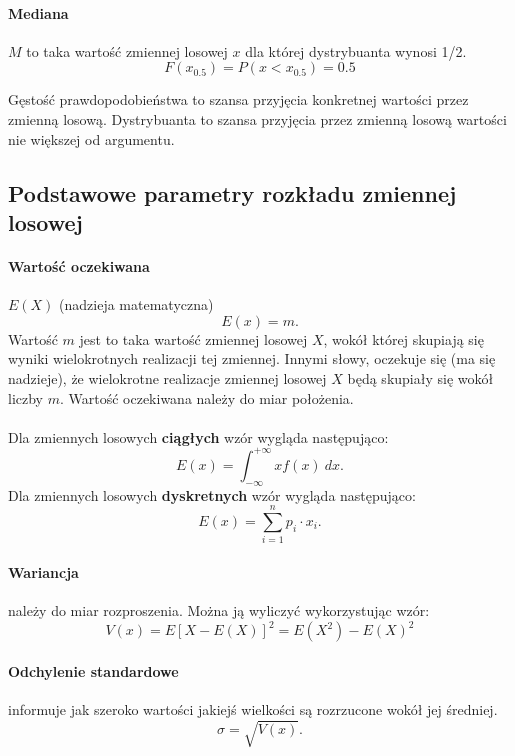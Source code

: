\documentclass[a4paper,twoside]{report}
\begin{document}
\paragraph{Mediana} $M$ to taka wartość zmiennej losowej $x$ dla której dystrybuanta wynosi 1/2.
\begin{equation}
F(x_{0.5}) = P(x < x_{0.5}) = 0.5
\end{equation}


Gęstość prawdopodobieństwa to szansa przyjęcia konkretnej wartości
przez zmienną losową. Dystrybuanta to szansa przyjęcia przez zmienną
losową wartości nie większej od argumentu.

\subsection{Podstawowe parametry rozkładu zmiennej losowej}
\paragraph{Wartość oczekiwana} $E(X)$ (nadzieja matematyczna)
\begin{equation}
E(x) = m.
\end{equation}
Wartość $m$ jest to taka wartość zmiennej losowej $X$, wokół której skupiają się
wyniki wielokrotnych realizacji tej zmiennej. Innymi słowy, oczekuje się (ma
się nadzieje), że wielokrotne realizacje zmiennej losowej $X$ będą skupiały się
wokół liczby $m$. Wartość oczekiwana należy do miar położenia. \\\\
Dla zmiennych losowych \textbf{ciągłych} wzór wygląda następująco:
\begin{equation}
E(x) = \int_{-\infty}^{+ \infty} xf(x)~dx.
\end{equation}
Dla zmiennych losowych \textbf{dyskretnych} wzór wygląda następująco:
\begin{equation}
E(x) = \sum_{i=1}^{n} p_i \cdot x_i.
\end{equation}
\medskip
\paragraph{Wariancja} należy do miar rozproszenia. Można ją wyliczyć wykorzystując wzór:
\begin{equation}
V(x) = E[X - E(X)]^2 = E(X^2)-E(X)^2
\end{equation}
\medskip

\paragraph{Odchylenie standardowe} informuje jak szeroko wartości jakiejś wielkości są rozrzucone wokół jej średniej. 
\begin{equation}
\sigma = \sqrt{V(x)}.
\end{equation}
\end{document}
